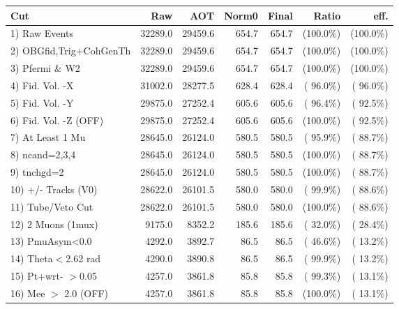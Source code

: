  \begin{table}[h!]\centering
 \begin{tabular}{||l||r|r|r|r|r|r||}
 \hline
 \hline
 Cut & Raw & AOT & Norm0 & Final & Ratio & eff.       \\
 \hline
  1) Raw Events           &      32289.0 &      29459.6 &        654.7 &        654.7 & (100.0\%) & (100.0\%) \\
  2) OBGfid,Trig+CohGenTh &      32289.0 &      29459.6 &        654.7 &        654.7 & (100.0\%) & (100.0\%) \\
  3) Pfermi \& W2         &      32289.0 &      29459.6 &        654.7 &        654.7 & (100.0\%) & (100.0\%) \\
  4) Fid. Vol. -X         &      31002.0 &      28277.5 &        628.4 &        628.4 & ( 96.0\%) & ( 96.0\%) \\
  5) Fid. Vol. -Y         &      29875.0 &      27252.4 &        605.6 &        605.6 & ( 96.4\%) & ( 92.5\%) \\
  6) Fid. Vol. -Z (OFF)   &      29875.0 &      27252.4 &        605.6 &        605.6 & (100.0\%) & ( 92.5\%) \\
  7) At Least 1 Mu        &      28645.0 &      26124.0 &        580.5 &        580.5 & ( 95.9\%) & ( 88.7\%) \\
  8) ncand=2,3,4          &      28645.0 &      26124.0 &        580.5 &        580.5 & (100.0\%) & ( 88.7\%) \\
  9) tnchgd=2             &      28645.0 &      26124.0 &        580.5 &        580.5 & (100.0\%) & ( 88.7\%) \\
 10) +/- Tracks (V0)      &      28622.0 &      26101.5 &        580.0 &        580.0 & ( 99.9\%) & ( 88.6\%) \\
 11) Tube/Veto Cut        &      28622.0 &      26101.5 &        580.0 &        580.0 & (100.0\%) & ( 88.6\%) \\
 12) 2 Muons (1mux)       &       9175.0 &       8352.2 &        185.6 &        185.6 & ( 32.0\%) & ( 28.4\%) \\
 13) PmuAsym<0.0          &       4292.0 &       3892.7 &         86.5 &         86.5 & ( 46.6\%) & ( 13.2\%) \\
 14) Theta$<$2.62 rad     &       4290.0 &       3890.8 &         86.5 &         86.5 & ( 99.9\%) & ( 13.2\%) \\
 15) Pt+wrt- $>$0.05      &       4257.0 &       3861.8 &         85.8 &         85.8 & ( 99.3\%) & ( 13.1\%) \\
 16) Mee $>$ 2.0  (OFF)   &       4257.0 &       3861.8 &         85.8 &         85.8 & (100.0\%) & ( 13.1\%) \\

\end{tabular}
\end{table}
